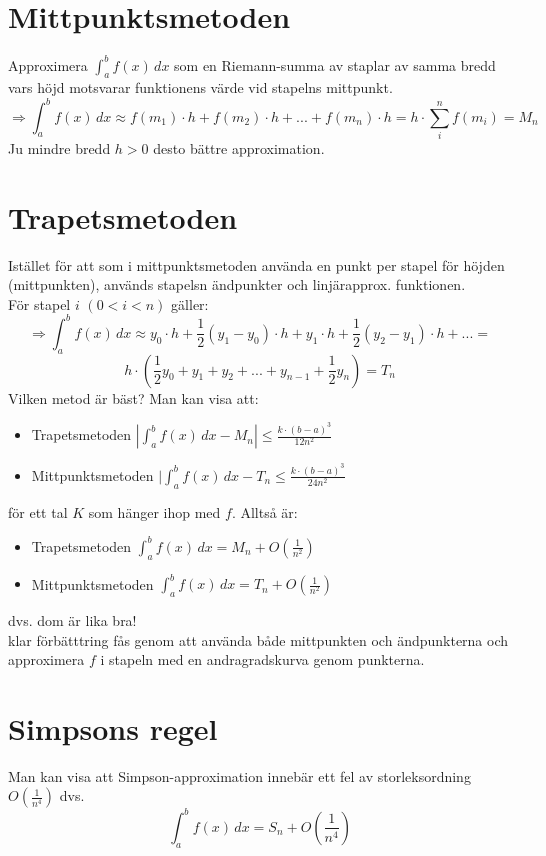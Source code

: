 \section{Mittpunktsmetoden}
Approximera $\int_a^b f(x)\, dx$ som en Riemann-summa av staplar av samma bredd vars höjd motsvarar funktionens värde vid stapelns mittpunkt.\\
\begin{equation*}
    \Rightarrow \int_a^b f(x)\, dx \approx
    f(m_1)\cdot h+f(m_2)\cdot h+...+f(m_n)\cdot h=
    h\cdot\sum_i^n f(m_i)=
    M_n
\end{equation*}
Ju mindre bredd $h>0$ desto bättre approximation.

\section{Trapetsmetoden}
Istället för att som i mittpunktsmetoden använda en punkt per stapel för höjden (mittpunkten), används stapelsn ändpunkter och linjärapprox. funktionen.\\
För stapel $i$ $(0<i<n)$ gäller:
\begin{equation*}
    \Rightarrow \int_a^b f(x)\, dx\approx
    y_0\cdot h+\frac{1}{2}(y_1-y_0)\cdot h+y_1\cdot h+\frac{1}{2}(y_2-y_1)\cdot h+...=
\end{equation*}
\begin{equation*}
    h\cdot(\frac{1}{2}y_0+y_1+y_2+...+y_{n-1}+\frac{1}{2}y_n)=T_n
\end{equation*}
Vilken metod är bäst?
Man kan visa att:
\begin{itemize}
    \item Trapetsmetoden $|\int_a^b f(x)\, dx-M_n|\leq \frac{k\cdot(b-a)^3}{12n^2}$
    \item Mittpunktsmetoden $|\int_a^b f(x)\, dx-T_n\leq\frac{k\cdot(b-a)^3}{24n^2}$
\end{itemize}
för ett tal $K$ som hänger ihop med $f$.
Alltså är:
\begin{itemize}
    \item Trapetsmetoden $\int_a^b f(x)\, dx=M_n+O(\frac{1}{n^2})$
    \item Mittpunktsmetoden $\int_a^b f(x)\, dx=T_n+O(\frac{1}{n^2})$
\end{itemize}
dvs. dom är lika bra!\\
klar förbätttring fås genom att använda både mittpunkten och ändpunkterna och approximera $f$ i stapeln med en andragradskurva genom punkterna.
\section{Simpsons regel}
Man kan visa att Simpson-approximation innebär ett fel av storleksordning $O(\frac{1}{n^4})$ dvs.
\begin{equation*}
    \int_a^b f(x)\, dx=S_n+O(\frac{1}{n^4})
\end{equation*}